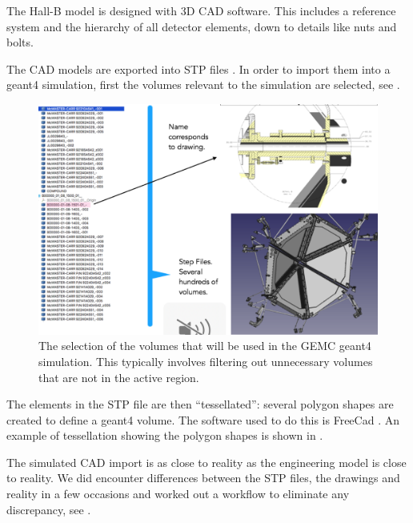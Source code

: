 The Hall-B model is designed with 3D CAD software. This includes a reference system and the
hierarchy of all detector elements, down to details like nuts and bolts.


The CAD models are exported into STP files \cite{stepFiles}.
In order to import them into a geant4 simulation, first the volumes relevant to the simulation are selected, see .

\begin{figure}
	\centering
	\includegraphics[width=0.98\columnwidth,keepaspectratio]{img/cadSelection.png}
	\caption{The selection of the volumes that will be used in the GEMC geant4 simulation.
             This typically involves filtering out unnecessary volumes that are not in the active region.}
	\label{fig:cadSelection}
\end{figure}


The elements in the STP file are then ``tessellated'': several polygon shapes are created to define a geant4 volume.
The software used to do this is FreeCad \cite{freeCad}. An example of tessellation showing the polygon shapes
is shown in .

The simulated CAD import is as close to reality as the engineering model is close to reality.
We did encounter differences between the STP files, the drawings and reality in a few occasions and worked
out a workflow to eliminate any discrepancy, see .


